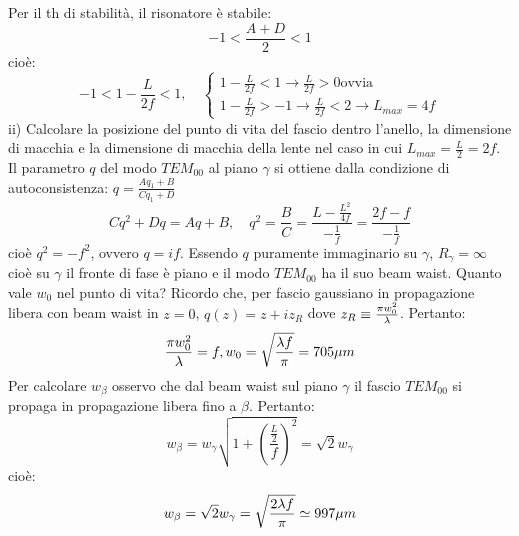 Per il th di stabilità, il risonatore è stabile:
\begin{equation*}
-1 < \frac{A+D}{2} < 1
\end{equation*}
cioè:
\begin{equation*}
-1 < 1-\frac{L}{2f} < 1, \quad \begin{cases}
1 - \frac{L}{2f} < 1 \rightarrow \frac{L}{2f} > 0 \text{ovvia}\\
1-\frac{L}{2f} > -1 \rightarrow \frac{L}{2f} < 2 \rightarrow L_{max} =4f
\end{cases}
\end{equation*}
ii) Calcolare la posizione del punto di vita del fascio dentro l'anello, la dimensione di macchia e la dimensione di macchia della lente nel caso in cui $L_{max} = \frac{L}{2} = 2f$.
Il parametro $q$ del modo $TEM_00$ al piano $\gamma$ si ottiene dalla condizione di autoconsistenza: $q = \frac{Aq_1 + B}{Cq_1 + D}$
\begin{equation*}
Cq^2 + Dq = Aq + B, \quad q^2=\frac{B}{C} = \frac{L - \frac{L^2}{4f}}{-\frac{1}{f}} = \frac{2f - f}{-\frac{1}{f}}
\end{equation*}
cioè $q^2 = -f^2$, ovvero $q = if$.
Essendo $q$ puramente immaginario su $\gamma$, $R_\gamma=\infty$ cioè su $\gamma$ il fronte di fase è piano e il modo $TEM_{00}$ ha il suo beam waist. Quanto vale $w_0$ nel punto di vita? Ricordo che, per fascio gaussiano in propagazione libera con beam waist in $z=0$, $q(z) = z +iz_R$ dove $z_R \equiv \frac{\pi w_0^2}{\lambda}$. Pertanto:
\begin{equation*}
\frac{\pi w_0^2}{\lambda} = f, w_0 = \sqrt{\frac{\lambda f}{\pi}} = 705 \mu m
\end{equation*}
Per calcolare $w_\beta$ osservo che dal beam waist sul piano $\gamma$ il fascio $TEM_{00}$ si propaga in propagazione libera fino a $\beta$. Pertanto:
\begin{equation*}
w_\beta = w_\gamma \sqrt{1+ \left(\frac{\frac{L}{2}}{f}\right)^2} = \sqrt{2}w_\gamma
\end{equation*}
cioè:
\begin{equation*}
w_\beta = \sqrt{2}w_\gamma = \sqrt{\frac{2\lambda f}{\pi}} \simeq 997 \mu m
\end{equation*}








